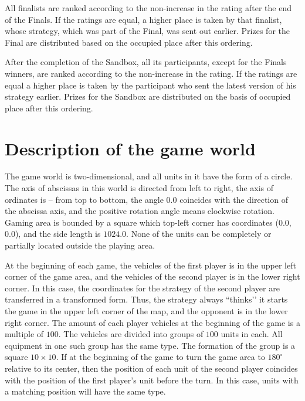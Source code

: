 All finalists are ranked according to the non-increase in the rating after the end of the Finals. If the ratings are equal, a higher place is taken by that finalist, whose strategy, which was part of the Final, was sent out earlier. Prizes for the Final are distributed based on the occupied place after this
ordering.

After the completion of the Sandbox, all its participants, except for the Finals winners, are ranked according to the non-increase in the rating. If the ratings are equal 
a higher place is taken by the participant who sent the latest version of his strategy earlier. Prizes for the Sandbox are distributed on the basis of
occupied place after this ordering.

\section{Description of the game world}

The game world is two-dimensional, and all units in it have the form of a circle. The axis of abscissas in this world is directed from left to right, the axis of ordinates is --
from top to bottom, the angle $0.0$ coincides with the direction of the abscissa axis, and the positive rotation angle means clockwise rotation. Gaming
area is bounded by a square which top-left corner has coordinates ($0.0$, $0.0$), and the side length is $1024.0$. None of the units
can be completely or partially located outside the playing area.

At the beginning of each game, the vehicles of the first player is in the upper left corner of the game area, and the vehicles of the second player is in the lower right corner. In this case, the coordinates for the strategy of the second player are transferred in a transformed form. Thus, the strategy always ``thinks’’ it starts
the game in the upper left corner of the map, and the opponent is in the lower right corner. The amount of each player vehicles at the beginning of the game is a multiple of $100$. The vehicles are divided into groups of $100$ units in each. All equipment in one such group has the same type. The formation of the group is a square $10\times10$. If at the beginning of the game to turn the game area to $180^\circ$ relative to its center, then the position of each unit of the second player
coincides with the position of the first player's unit before the turn. In this case, units with a matching position will have the same type.

